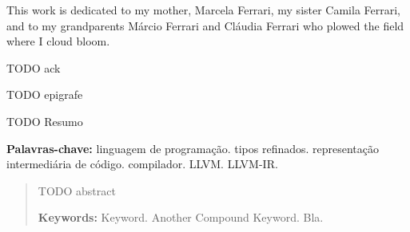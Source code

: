 \documentclass[
    oneside,
    english,
    coorientadorbanca,
    embeddedlogo,
    noabntexcite
]{ufsc-thesis-rn46-2019}
\begin{document}

\pretextual{}
\imprimircapa{}
\imprimirfolhaderosto*
\protect{}%
\imprimirfolhadecertificacao{}



\begin{dedicatoria}
    This work is dedicated to my mother, Marcela Ferrari, my sister Camila Ferrari, and to my grandparents Márcio Ferrari and Cláudia Ferrari who plowed the field where I cloud bloom.
\end{dedicatoria}

\begin{agradecimentos}
    TODO ack
\end{agradecimentos}

\begin{epigrafe}
    TODO epigrafe
\end{epigrafe}

\begin{resumo}[Resumo]
    TODO Resumo

    \vspace{\baselineskip}
    \textbf{Palavras-chave:} linguagem de programação\@. tipos refinados\@. representação intermediária de código\@. compilador\@. LLVM\@. LLVM-IR\@.
\end{resumo}

\begin{abstract}
    TODO abstract

    \vspace{\baselineskip}
    \textbf{Keywords:} Keyword. Another Compound Keyword. Bla.
\end{abstract}

\listoffigures*  %
\end{document}
